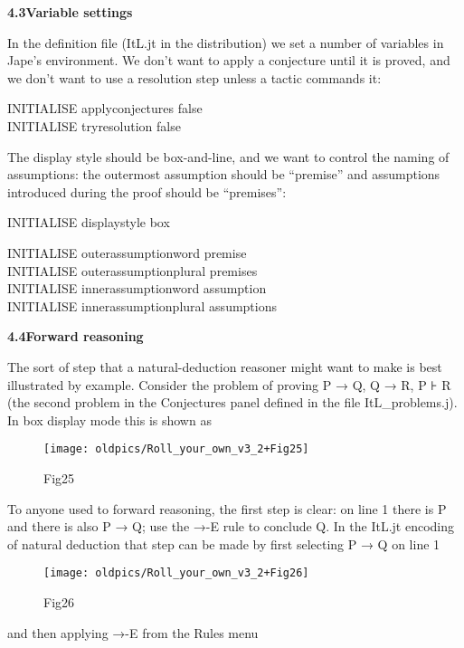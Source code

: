 \documentclass[11pt]{book}
\newcommand{\tab}{\hspace{5mm}}
\begin{document}
\textbf{{\large 4.3\tab Variable settings}}


In the definition file (ItL.jt in the distribution) we set a number of variables in Jape's environment. We don't want to apply a conjecture until it is proved, and we don't want to use a resolution step unless a tactic commands it:

INITIALISE applyconjectures false\\
INITIALISE tryresolution false


The display style should be box-and-line, and we want to control the naming of assumptions: the outermost assumption should be ``premise'' and assumptions introduced during the proof should be ``premises'':

INITIALISE displaystyle box

INITIALISE outerassumptionword premise\\
INITIALISE outerassumptionplural premises\\
INITIALISE innerassumptionword assumption\\
INITIALISE innerassumptionplural assumptions


\textbf{{\large 4.4\tab Forward reasoning}}


The sort of step that a natural-deduction reasoner might want to make is best illustrated by example. Consider the problem of proving P → Q, Q → R, P ⊦ R (the second problem in the Conjectures panel defined in the file ItL\_problems.j). In box display mode this is shown as

\begin{figure}[htbp] \begin{center} \texttt{[image: oldpics/Roll\_your\_own\_v3\_2+Fig25]} \caption{Fig25} \end{center} \end{figure}


To anyone used to forward reasoning, the first step is clear: on line 1 there is P and there is also P → Q; use the →-E rule to conclude Q. In the ItL.jt encoding of natural deduction that step can be made by first selecting P → Q on line 1

\begin{figure}[htbp] \begin{center} \texttt{[image: oldpics/Roll\_your\_own\_v3\_2+Fig26]} \caption{Fig26} \end{center} \end{figure}


and then applying →-E from the Rules menu
\end{document}
